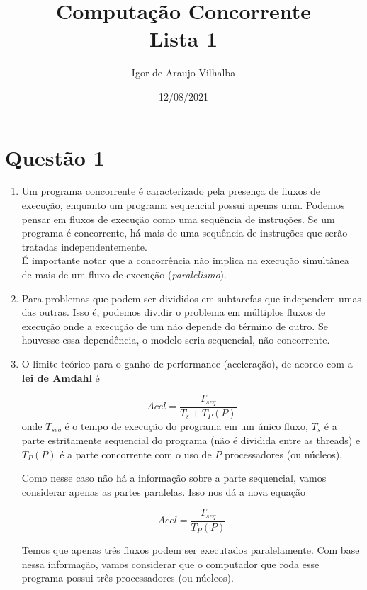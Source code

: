 \documentclass{article}
\title{\Large \textbf{Computação Concorrente}\\
	\large Lista 1
}
\author{Igor de Araujo Vilhalba}
\date{12/08/2021}
\begin{document}
\maketitle

\section*{Questão 1}

\begin{enumerate}[label=\textbf{\alph*)}]
	\item Um programa concorrente é caracterizado pela presença de fluxos de execução,
		enquanto um programa sequencial possui apenas uma. Podemos pensar em fluxos
		de execução como uma sequência de instruções. Se um programa é concorrente,
		há mais de uma sequência de instruções que serão tratadas independentemente.\\
		É importante notar que a concorrência não implica na execução simultânea de
		mais de um fluxo de execução (\emph{paralelismo}).
	\item Para problemas que podem ser divididos em subtarefas que independem umas das
		outras. Isso é, podemos dividir o problema em múltiplos fluxos de execução
		onde a execução de um não depende do término de outro. Se houvesse essa
		dependência, o modelo seria sequencial, não concorrente.
	\item O limite teórico para o ganho de performance (aceleração), de acordo com
		a \textbf{lei de Amdahl} é
		\begin{center}
			$$
			Acel = \frac{T_{seq}}{T_s+T_P(P)}
			$$
			onde $T_{seq}$ é o tempo de execução do programa em um único fluxo,
			$T_s$ é a parte estritamente sequencial do programa (não é dividida
			entre as threads) e $T_P(P)$ é a parte concorrente com o uso de $P$
			processadores (ou núcleos).
		\end{center}
		Como nesse caso não há a informação sobre a parte sequencial, vamos considerar apenas
		as partes paralelas. Isso nos dá a nova equação
		\begin{center}
			$$
			Acel = \frac{T_{seq}}{T_P(P)}
			$$
		\end{center}
		Temos que apenas três fluxos podem ser executados paralelamente. Com base nessa informação,
		vamos considerar que o computador que roda esse programa possui três processadores (ou núcleos).\\


\end{enumerate}
\end{document}
